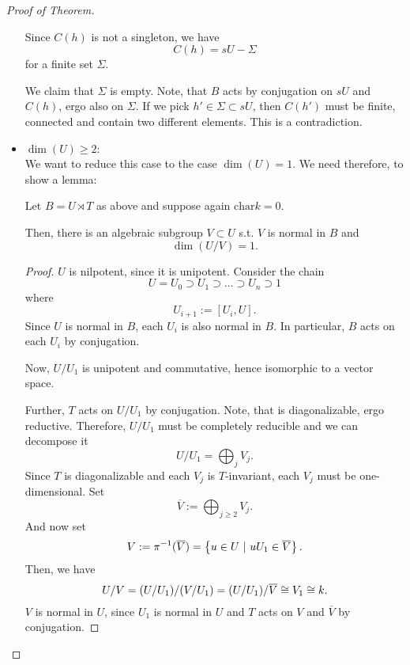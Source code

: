 \begin{proof}[Proof of Theorem]
\begin{itemize}
		Since $C(h)$ is not a singleton, we have
		\[ C(h) = sU  - \Sigma \]
		for a finite set $\Sigma$.
		
		We claim that $\Sigma$ is empty. Note, that $B$ acts by conjugation on $sU$ and $C(h)$, ergo also on $\Sigma$. If we pick $h' \in \Sigma \subset sU$, then $C(h')$ must be finite, connected and contain two different elements. This is a contradiction.
		\item $\dim(U) \geq 2$:\\
		We want to reduce this case to the case $\dim (U) = 1$. We need therefore, to show a lemma:
		\begin{lemma}
			Let $B = U \rtimes T$ as above and suppose again $\mathrm{char} k = 0$.
			
			Then, there is an algebraic subgroup $V \subset U$ s.t. $V$ is normal in $B$ and
			\[ \dim(U/V) = 1. \]
		\end{lemma}
	\begin{proof}
		$U$ is nilpotent, since it is unipotent.
		Consider the chain
		\[ U = U_0 \supset U_1 \supset \ldots \supset U_n \supset 1 \]
		where
		\[ U_{i+1} := [U_i, U]. \]
		Since $U$ is normal in $B$, each $U_i$ is also normal in $B$. In particular, $B$ acts on each $U_i$ by conjugation.
		
		Now, $U/U_1$ is unipotent and commutative, hence isomorphic to a vector space.
		
		Further, $T$ acts on $U/U_1$ by conjugation. Note, that is diagonalizable, ergo reductive. Therefore, $U/U_1$ must be completely reducible and we can decompose it
		\[ U/U_1 = \bigoplus_j V_j. \]
		Since $T$ is diagonalizable and each $V_j$ is $T$-invariant, each $V_j$ must be one-dimensional. Set
		\[ \overline{V} := \bigoplus_{j \geq 2} V_j. \]
		And now set
		\[ V := \pi^{-1}(\overline{V}) = \left\lbrace u \in U ~ | ~ uU_1 \in \overline{V}\right\rbrace. \]
		Then, we have
		\[ U/V = (U/U_1) / (V / U_1) = ( U / U_1) / \overline{V} \overset{}{\cong} V_1 \overset{}{\cong} k. \]
		$V$ is normal in $U$, since $U_1$ is normal in $U$ and $T$ acts on $V$ and $\overline{V}$ by conjugation.
	\end{proof}


\end{itemize}
\end{proof}
